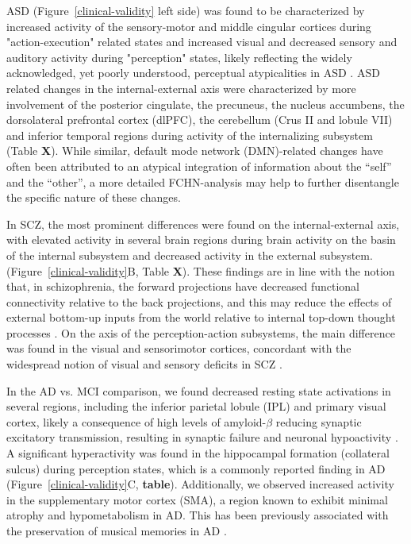 \documentclass{article}
\begin{document}
ASD (Figure~\ref{clinical-validity} left side) was found to be characterized by increased activity of the sensory-motor and middle cingular cortices during "action-execution" related states and increased visual and decreased sensory and auditory activity during "perception" states, likely reflecting the widely acknowledged, yet poorly understood, perceptual atypicalities in ASD \citep{hadad2019perception}.
ASD related changes in the internal-external axis were characterized by more involvement of the posterior cingulate, the precuneus, the nucleus accumbens, the dorsolateral prefrontal cortex (dlPFC), the cerebellum (Crus II and lobule VII) and inferior temporal regions during activity of the internalizing subsystem (Table \textbf{X}). While similar, default mode network (DMN)-related changes have often been attributed to an atypical integration of information about the ``self'' and the ``other'', a more detailed FCHN-analysis may help to further disentangle the specific nature of these changes.

In SCZ, the most prominent differences were found on the internal-external axis, with elevated activity in several brain regions during brain activity on the basin of the internal subsystem and decreased activity in the external subsystem. (Figure~\ref{clinical-validity}B, Table \textbf{X}). These findings are in line with the notion that, in schizophrenia, the forward projections have decreased functional connectivity relative to the back projections, and this may reduce the effects of external bottom-up inputs from the world relative to internal top-down thought processes \citep{rolls2021attractor}.
On the axis of the perception-action subsystems, the main difference was found in the visual and sensorimotor cortices, concordant with the widespread notion of visual and sensory deficits in SCZ \citep{javitt2009sensory, butler2008visual, adamek2022early}.

In the AD vs. MCI comparison, we found decreased resting state activations in several regions, including the inferior parietal lobule (IPL) and primary visual cortex, likely a consequence of high levels of amyloid-$\beta$ reducing synaptic excitatory transmission, resulting in synaptic failure and neuronal hypoactivity \citep{selkoe2002alzheimer}. A significant hyperactivity was found in the hippocampal formation (collateral sulcus) during perception states, which is
a commonly reported finding in AD \citep{aizenstein2015hippocampal, ewers2011neuroimaging}
(Figure~\ref{clinical-validity}C, \textbf{table}). Additionally, we observed increased activity in the supplementary motor cortex (SMA), a region known to exhibit minimal atrophy and hypometabolism in AD. This has been previously associated with the preservation of musical memories in AD \citep{jacobsen2015musical}.
\end{document}
